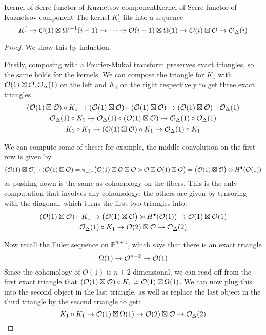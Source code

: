 \begin{proposition}{Kernel of Serre functor of Kuznetsov component}{Kernel of Serre functor of Kuznetsov component}   
The kernel $K_1^i$ fits into a sequence $$K_1^i\rightarrow \mathcal{O}(1)\boxtimes \Omega^{i-1}(i-1)\rightarrow \dots \rightarrow \mathcal{O}(i-1)\boxtimes \Omega(1)\rightarrow \mathcal{O}(i)\boxtimes \mathcal{O} \rightarrow \mathcal{O}_\Delta(i)$$
\end{proposition}
\begin{proof}
    We show this by induction.
    
    Firstly, composing with a Fourier-Mukai transform preserves exact triangles, so the same holds for the kernels. We can compose the triangle for $K_1$ with $\mathcal{O}(1)\boxtimes \mathcal{O}, \mathcal{O}_\Delta(1)$ on the left and $K_1$ on the right respectively to get three exact triangles \begin{gather*}
        (\mathcal{O}(1)\boxtimes \mathcal{O}) \circ K_1 \rightarrow (\mathcal{O}(1)\boxtimes \mathcal{O})  \circ (\mathcal{O}(1)\boxtimes \mathcal{O}) \rightarrow (\mathcal{O}(1)\boxtimes \mathcal{O}) \circ \mathcal{O}_\Delta(1)\\
        \mathcal{O}_\Delta(1)\circ K_1 \rightarrow \mathcal{O}_\Delta(1) \circ (\mathcal{O}(1)\boxtimes \mathcal{O})  \rightarrow \mathcal{O}_\Delta(1) \circ \mathcal{O}_\Delta(1)\\
        K_1 \circ K_1  \rightarrow (\mathcal{O}(1)\boxtimes \mathcal{O})\circ K_1 \rightarrow \mathcal{O}_\Delta(1)\circ K_1
    \end{gather*}
    
    We can compute some of these: for example, the middle convolution on the first row is given by $$(\mathcal{O}(1)\boxtimes \mathcal{O})  \circ (\mathcal{O}(1)\boxtimes \mathcal{O}) ={\pi_{13}}_*\big(\mathcal{O}(1)\boxtimes \mathcal{O} \boxtimes \mathcal{O} \otimes \mathcal{O} \boxtimes \mathcal{O}(1) \boxtimes O\big)=\big(\mathcal{O}(1)\boxtimes \mathcal{O}\big) \otimes H^\bullet(\mathcal{O}(1))$$
    as pushing down is the same as cohomology on the fibers. This is the only computation that involves any cohomology: the others are given by tensoring with the diagonal, which turns the first two triangles into: \begin{gather*}
        (\mathcal{O}(1)\boxtimes \mathcal{O}) \circ K_1 \rightarrow \big(\mathcal{O}(1)\boxtimes \mathcal{O}\big) \otimes H^\bullet(\mathcal{O}(1)) \rightarrow \mathcal{O}(1)\boxtimes \mathcal{O}(1)\\
        \mathcal{O}_\Delta(1)\circ K_1 \rightarrow \mathcal{O}(2)\boxtimes \mathcal{O} \rightarrow \mathcal{O}_\Delta(2)
    \end{gather*}
    
    Now recall the Euler sequence on $\mathbb{P}^{n+1}$, which says that there is an exact triangle $$\Omega(1)\rightarrow \mathcal{O}^{n+2}\rightarrow \mathcal{O}(1)$$
    Since the cohomology of $O(1)$ is $n+2$-dimensional, we can read off from the first exact triangle that $ (\mathcal{O}(1)\boxtimes \mathcal{O}) \circ K_1\simeq \mathcal{O}(1) \boxtimes \Omega(1)$. We can now plug this into the second object in the last triangle, as well as replace the last object in the third triangle by the second triangle to get: $$K_1 \circ K_1 \rightarrow \mathcal{O}(1)\boxtimes \Omega(1)\rightarrow \mathcal{O}(2)\boxtimes \mathcal{O} \rightarrow \mathcal{O}_\Delta(2)$$
    

\end{proof}
